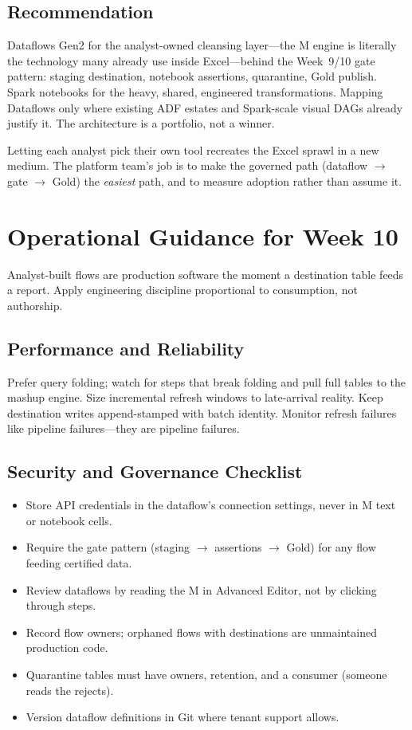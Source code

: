 \subsection{Recommendation}
Dataflows Gen2 for the analyst-owned cleansing layer---the M engine is literally the technology many already use inside Excel---behind the Week~9/10 gate pattern: staging destination, notebook assertions, quarantine, Gold publish. Spark notebooks for the heavy, shared, engineered transformations. Mapping Dataflows only where existing ADF estates and Spark-scale visual DAGs already justify it. The architecture is a portfolio, not a winner.

\begin{pitfall}
Letting each analyst pick their own tool recreates the Excel sprawl in a new medium. The platform team's job is to make the governed path (dataflow $\rightarrow$ gate $\rightarrow$ Gold) the \emph{easiest} path, and to measure adoption rather than assume it.
\end{pitfall}

\section{Operational Guidance for Week 10}
Analyst-built flows are production software the moment a destination table feeds a report. Apply engineering discipline proportional to consumption, not authorship.

\subsection{Performance and Reliability}
Prefer query folding; watch for steps that break folding and pull full tables to the mashup engine. Size incremental refresh windows to late-arrival reality. Keep destination writes append-stamped with batch identity. Monitor refresh failures like pipeline failures---they are pipeline failures.

\subsection{Security and Governance Checklist}
\begin{itemize}
    \item Store API credentials in the dataflow's connection settings, never in M text or notebook cells.
    \item Require the gate pattern (staging $\rightarrow$ assertions $\rightarrow$ Gold) for any flow feeding certified data.
    \item Review dataflows by reading the M in Advanced Editor, not by clicking through steps.
    \item Record flow owners; orphaned flows with destinations are unmaintained production code.
    \item Quarantine tables must have owners, retention, and a consumer (someone reads the rejects).
    \item Version dataflow definitions in Git where tenant support allows.
\end{itemize}

